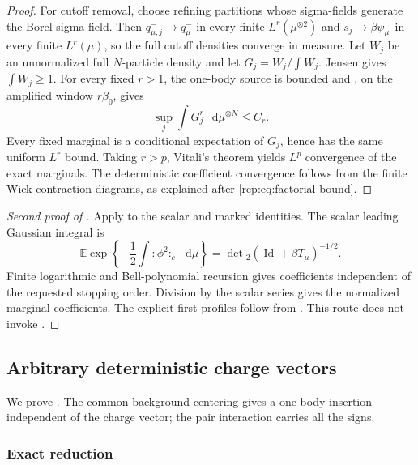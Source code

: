 \documentclass[11pt,reqno]{amsart}
\numberwithin{equation}{section}
\theoremstyle{plain}
\theoremstyle{definition}
\newcommand{\dd}{\mathop{}\!\mathrm d}
\newcommand{\E}{\mathbb E}
\newcommand{\Id}{\operatorname{Id}}
\newcommand{\be}{\beta}
\begin{document}
\begin{proof}
For cutoff removal, choose refining partitions whose sigma-fields generate the Borel sigma-field.  Then $q^-_{\mu,j}\to q^-_\mu$ in every finite $L^r(\mu^{\otimes2})$ and $s_j\to\be\psi^-_\mu$ in every finite $L^r(\mu)$, so the full cutoff densities converge in measure.  Let $W_j$ be an unnormalized full $N$-particle density and let $G_j=W_j/\int W_j$.  Jensen gives $\int W_j\ge1$.  For every fixed $r>1$, the one-body source is bounded and , on the amplified window $r\be_0$, gives
\begin{equation}
 \sup_j\int G_j^r\,\dd\mu^{\otimes N}\le C_r.
\end{equation}
Every fixed marginal is a conditional expectation of $G_j$, hence has the same uniform $L^r$ bound.  Taking $r>p$, Vitali's theorem yields $L^p$ convergence of the exact marginals.  The deterministic coefficient convergence follows from the finite Wick-contraction diagrams, as explained after \eqref{rep:eq:factorial-bound}.
\end{proof}

\begin{proof}[Second proof of ]
Apply  to the scalar and marked identities.  The scalar leading Gaussian integral is
\begin{equation}\label{rep:eq:leading-determinant}
 \E\exp\left\{-\frac12\int:\!\phi^2\!:_c\,\dd\mu\right\}
 =\det{}_2(\Id+\be T_\mu)^{-1/2}.
\end{equation}
Finite logarithmic and Bell-polynomial recursion gives coefficients independent of the requested stopping order.  Division by the scalar series gives the normalized marginal coefficients.  The explicit first profiles follow from .  This route does not invoke .
\end{proof}

\subsection{Arbitrary deterministic charge vectors}\label{rep:sec:arbitrary-charge}

We prove .  The common-background centering gives a one-body insertion independent of the charge vector; the pair interaction carries all the signs.

\subsubsection{Exact reduction}
\end{document}
